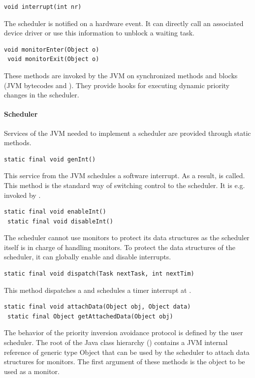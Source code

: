 \begin{lstlisting}[emph=interrupt]
void interrupt(int nr)
\end{lstlisting}
The scheduler is notified on a hardware event. It can directly call
an associated device driver or use this information to unblock a
waiting task.

\begin{lstlisting}[emph={monitorEnter,monitorExit}]
 void monitorEnter(Object o)
 void monitorExit(Object o)
\end{lstlisting}
These methods are invoked by the JVM on synchronized methods and
blocks (JVM bytecodes  and ).
They provide hooks for executing dynamic priority changes in the
scheduler.

\paragraph{Scheduler}

Services of the JVM needed to implement a scheduler are provided
through static methods.

\begin{lstlisting}[emph=genInt]
static final void genInt()
\end{lstlisting}
This service from the JVM schedules a software interrupt. As a
result,  is called. This method is the standard way
of switching control to the scheduler. It is e.g. invoked by
.

\begin{lstlisting}[emph={enableInt,disableInt}]
 static final void enableInt()
 static final void disableInt()
\end{lstlisting}
The scheduler cannot use monitors to protect its data structures as
the scheduler itself is in charge of handling monitors. To protect
the data structures of the scheduler, it can globally enable and
disable interrupts.

\begin{lstlisting}[emph=dispatch]
static final void dispatch(Task nextTask, int nextTim)
\end{lstlisting}
This method dispatches a  and schedules a timer interrupt
at .

\begin{lstlisting}[emph={attachData,getAttachedData}]
 static final void attachData(Object obj, Object data)
 static final Object getAttachedData(Object obj)
\end{lstlisting}
The behavior of the priority inversion avoidance protocol is defined
by the user scheduler. The root of the Java class hierarchy
() contains a JVM internal reference of
generic type Object that can be used by the scheduler to attach data
structures for monitors. The first argument of these methods is the
object to be used as a monitor.

